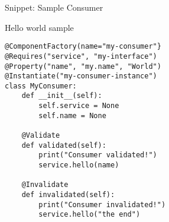 \begin{frame}[fragile]{Snippet: Sample Consumer}
\begin{block}{Hello world sample}
\begin{verbatim}
@ComponentFactory(name="my-consumer"}
@Requires("service", "my-interface")
@Property("name", "my.name", "World")
@Instantiate("my-consumer-instance")
class MyConsumer:
    def __init__(self):
        self.service = None
        self.name = None

    @Validate
    def validated(self):
        print("Consumer validated!")
        service.hello(name)
	
    @Invalidate
    def invalidated(self):
        print("Consumer invalidated!")
        service.hello("the end")
\end{verbatim}
\end{block}
\end{frame}
